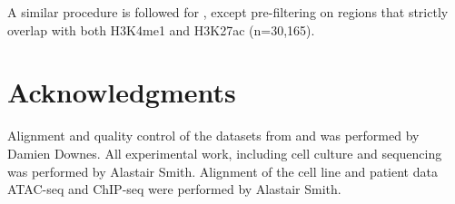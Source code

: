 A similar procedure is followed for , except pre-filtering on regions that strictly overlap with both H3K4me1 and H3K27ac (n=30,165). 

\section{Acknowledgments}

Alignment and quality control of the datasets from \textcite{Corces2016} and \textcite{Ludwig2019} was performed by Damien Downes. All experimental work, including cell culture and sequencing was performed by Alastair Smith. Alignment of the cell line and patient data ATAC-seq and ChIP-seq were performed by Alastair Smith.


% 

